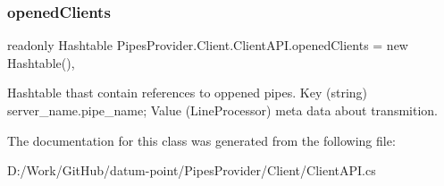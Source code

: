 \subsubsection{\texorpdfstring{opened\+Clients}{openedClients}}
{\footnotesize\ttfamily readonly Hashtable Pipes\+Provider.\+Client.\+Client\+A\+P\+I.\+opened\+Clients = new Hashtable()\hspace{0.3cm}{\ttfamily [static]}, {\ttfamily [private]}}



Hashtable thast contain references to oppened pipes. Key (string) server\+\_\+name.\+pipe\+\_\+name; Value (Line\+Processor) meta data about transmition. 



The documentation for this class was generated from the following file\+:\begin{DoxyCompactItemize}
\item 
D\+:/\+Work/\+Git\+Hub/datum-\/point/\+Pipes\+Provider/\+Client/Client\+A\+P\+I.\+cs\end{DoxyCompactItemize}
